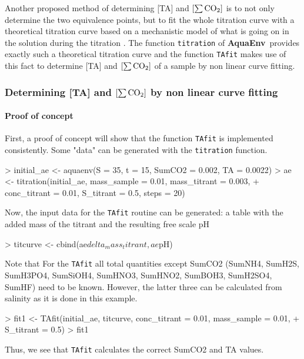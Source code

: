 \documentclass[article,nojss]{jss}
\newcommand{\aq}{\textbf{\textsf{AquaEnv}}}
\begin{document}
Another proposed method of determining [TA] and $\rm [\sum CO_2]$ is to not only determine the two equivalence points, but to
fit the whole titration curve with a theoretical titration curve based on a mechanistic model 
of what is going on in the solution during the titration \citep{Dickson1981, DOE1994, Anderson1999}. 
The function \texttt{titration} of \aq$\,$ provides exactly such a theoretical titration curve and the function \texttt{TAfit} makes use of this fact to
determine [TA] and $\rm [\sum CO_2]$ of a sample by non linear curve fitting. 


\subsubsection{Determining [TA] and $\rm [\sum CO_2]$ by non linear curve fitting}

\paragraph{Proof of concept}$\,$\\
First, a proof of concept will show that the function \texttt{TAfit} is implemented consistently.
Some "data" can be generated with the \texttt{titration} function.

\begin{Schunk}
\begin{Sinput}
> initial_ae <- aquaenv(S = 35, t = 15, SumCO2 = 0.002, TA = 0.0022)
> ae <- titration(initial_ae, mass_sample = 0.01, mass_titrant = 0.003, 
+     conc_titrant = 0.01, S_titrant = 0.5, steps = 20)
\end{Sinput}
\end{Schunk}
Now, the input data for the \texttt{TAfit} routine can be generated: a table with the added mass of the titrant and the resulting free scale pH
\begin{Schunk}
\begin{Sinput}
> titcurve <- cbind(ae$delta_mass_titrant, ae$pH)
\end{Sinput}
\end{Schunk}
Note that For the \texttt{TAfit} all total quantities except SumCO2 (SumNH4, SumH2S, SumH3PO4, SumSiOH4, SumHNO3, SumHNO2, SumBOH3, SumH2SO4, SumHF)
need to be known. However, the latter three can be calculated from salinity as it is done in this example. 
\begin{Schunk}
\begin{Sinput}
> fit1 <- TAfit(initial_ae, titcurve, conc_titrant = 0.01, mass_sample = 0.01, 
+     S_titrant = 0.5)
> fit1
\end{Sinput}
\end{Schunk}
Thus, we see that \texttt{TAfit} calculates the correct SumCO2 and TA values.\\
\end{document}
